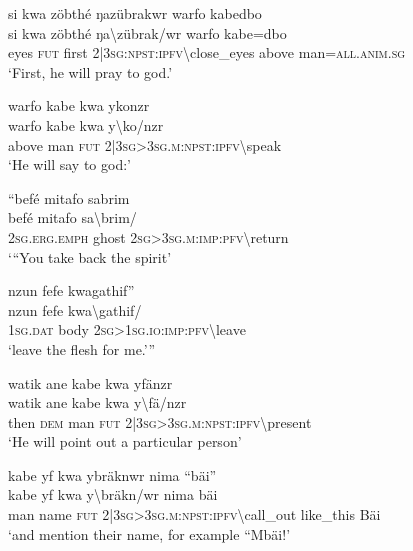 \ea\label{ex:a4340}
si kwa zöbthé ŋazübrakwr warfo kabedbo\\
\gll si	kwa	zöbthé	ŋa{\textbackslash}zübrak/wr	warfo	kabe=dbo\\
     eyes	\textsc{fut}	first	2|3\textsc{sg}:\textsc{npst}:\textsc{ipfv}{\textbackslash}close\_eyes	above	man=\textsc{all}.\textsc{anim}.\textsc{sg}\\
\glt `First, he will pray to god.'
\z

\ea\label{ex:a4341}
warfo kabe kwa ykonzr\\
\gll warfo	kabe	kwa	y{\textbackslash}ko/nzr\\
     above	man	\textsc{fut}	2|3\textsc{sg}>3\textsc{sg}.\textsc{m}:\textsc{npst}:\textsc{ipfv}{\textbackslash}speak\\
\glt `He will say to god:'
\z

\ea\label{ex:a4342}
``befé mitafo sabrim\\
\gll befé	mitafo	sa{\textbackslash}brim/\\
     2\textsc{sg}.\textsc{erg}.\textsc{emph}	ghost	2\textsc{sg}>3\textsc{sg}.\textsc{m}:\textsc{imp}:\textsc{pfv}{\textbackslash}return\\
\glt `{``}You take back the spirit'
\z

\ea\label{ex:a4343}
nzun fefe kwagathif''\\
\gll nzun	fefe	kwa{\textbackslash}gathif/\\
     1\textsc{sg}.\textsc{dat}	body	2\textsc{sg}>1\textsc{sg}.\textsc{io}:\textsc{imp}:\textsc{pfv}{\textbackslash}leave\\
\glt `leave the flesh for me.'''
\z

\ea\label{ex:a4344}
watik ane kabe kwa yfänzr\\
\gll watik	ane	kabe	kwa	y{\textbackslash}fä/nzr\\
     then	\textsc{dem}	man	\textsc{fut}	2|3\textsc{sg}>3\textsc{sg}.\textsc{m}:\textsc{npst}:\textsc{ipfv}{\textbackslash}present\\
\glt `He will point out a particular person'
\z

\ea\label{ex:a4345}
kabe yf kwa ybräknwr nima ``bäi''\\
\gll kabe	yf	kwa	y{\textbackslash}bräkn/wr	nima	bäi\\
     man	name	\textsc{fut}	2|3\textsc{sg}>3\textsc{sg}.\textsc{m}:\textsc{npst}:\textsc{ipfv}{\textbackslash}call\_out	like\_this	Bäi\\
\glt `and mention their name, for example ``Mbäi!'
\z

